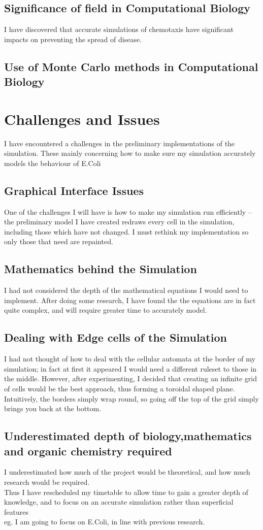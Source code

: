 \documentclass[a4paper,onecolumn,oneside]{article}
\begin{document}
\subsection{Significance of field in Computational Biology}
I have discovered that accurate simulations of chemotaxis have significant impacts on preventing the spread of disease.
\subsection{Use of Monte Carlo methods in Computational Biology}

\section{Challenges and Issues}
I have encountered a challenges in the preliminary implementations of the simulation. These mainly concerning how to make sure my simulation
accurately models the behaviour of E.Coli
\subsection{Graphical Interface Issues}
One of the challenges I will have is how to make my simulation run efficiently -- the preliminary model I have created redraws every cell in the simulation, 
including those which have not changed. I must rethink my implementation so only those that need are repainted.
\subsection{Mathematics behind the Simulation}
I had not considered the depth of the mathematical equations I would need to implement. After doing some research, I have found the the equations are in fact quite complex,
and will require greater time to accurately model.
\subsection{Dealing with Edge cells of the Simulation}
I had not thought of how to deal with the cellular automata at the border of my simulation; in fact at first it appeared I would need a different ruleset to those in the middle. However, 
after experimenting, I decided that creating an infinite grid of cells would be the best approach, thus forming a toroidal shaped plane. Intuitively, the borders simply wrap round, so going off the top of 
the grid simply brings you back at the bottom.
\subsection{Underestimated depth of biology,mathematics and organic chemistry required}
I underestimated how much of the project would be theoretical, and how much research would be required. \\
Thus I have rescheduled my timetable to allow time to gain a greater depth of knowledge, and to focus on an accurate simulation rather than superficial features\\
eg. I am going to focus on E.Coli, in line with previous research.
\end{document}
